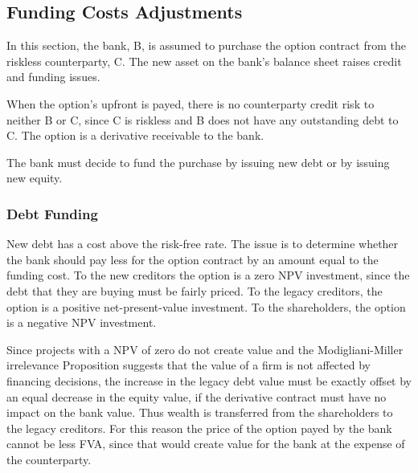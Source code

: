 \documentclass[10pt,a4paper]{article}
\begin{document}
        \subsection{Funding Costs Adjustments}
            In this section, the bank, B, is assumed to purchase the option contract from the riskless counterparty, C. The new asset on the bank's balance sheet raises credit and funding issues.

            When the option's upfront is payed, there is no counterparty credit risk to neither B or C, since C is riskless and B does not have any outstanding debt to C. The option is a derivative receivable to the bank.

            The bank must decide to fund the purchase by issuing new debt or by issuing new equity.

            \subsubsection{Debt Funding}
                New debt has a cost above the risk-free rate. The issue is to determine whether the bank should pay less for the option contract by an amount equal to the funding cost. To the new creditors the option is a zero NPV investment, since the debt that they are buying must be fairly priced. To the legacy creditors, the option is a positive net-present-value investment. To the shareholders, the option is a negative NPV investment.

                Since projects with a NPV of zero do not create value and the Modigliani-Miller irrelevance Proposition suggests that the value of a firm is not affected by financing decisions, the increase in the legacy debt value must be exactly offset by an equal decrease in the equity value, if the derivative contract must have no impact on the bank value. Thus wealth is transferred from the shareholders to the legacy creditors. For this reason the price of the option payed by the bank cannot be less FVA, since that would create value for the bank at the expense of the counterparty.
\end{document}
